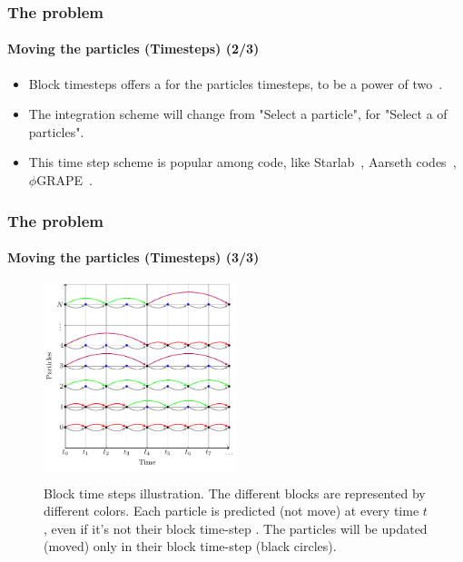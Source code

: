 \begin{frame}
    \frametitle{The {\nbody} problem}
    \framesubtitle{Moving the particles (Timesteps) (2/3)}

    \begin{itemize}
        \item Block timesteps offers a  for the particles timesteps,
              to be a power of two~\cite{Press86}.
        \item The integration scheme will change from "Select a particle",
              for "Select a  of particles".
        \item This time step scheme is popular among  {\nbody} code,
              like Starlab~\cite{portegies2001, hut2003}, Aarseth {\nbody}
              codes~\cite{Aarseth99, Aarseth03,NitadoriAarseth2012},
              $\phi$GRAPE~\cite{harfst2008}.
    \end{itemize}
\end{frame}

\begin{frame}
    \frametitle{The {\nbody} problem}
    \framesubtitle{Moving the particles (Timesteps) (3/3)}

          \begin{figure}[H]
              \centering
              \colorbox{white}{%
              \includegraphics[width=0.5\textwidth]{img/block_time-steps.pdf}
              }%
              \label{fig:block_time steps}
              \caption{Block time steps illustration.
                       The different blocks are represented by different colors.
                       Each particle is predicted (not move) at every time $t$ ,
                       even if it's not their block time-step .
                       The particles will be updated (moved) only in their block time-step
                       (black circles).}
          \end{figure}

\end{frame}


